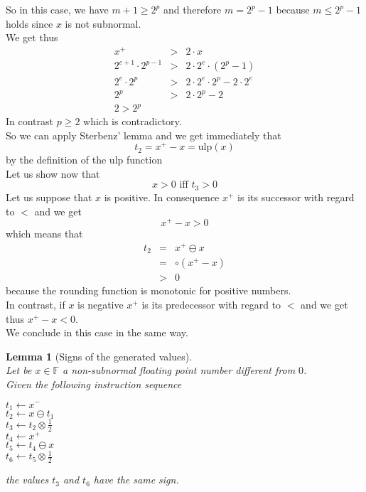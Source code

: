 \documentclass[a4paper,10pt,twoside]{article}
\newtheorem{lemma}[theorem]{Lemma}
\newenvironment{proof}[1][Proof]{\begin{trivlist}
\item[\hskip \labelsep {\bfseries #1}]}{\end{trivlist}}
\newcommand{\qed}{\nobreak \ifvmode \relax \else \ifdim \lastskip<1.5em \hskip-\lastskip
\hskip1.5em plus0em minus0.5em \fi \nobreak \vrule height0.75em width0.5em depth0.25em\fi}
\newcommand{\F}{\ensuremath{\mathbb {F}}}
\newcommand{\mUlp}{\ensuremath{\mathrm{ulp}}}
\begin{document}
\begin{proof}
So in this case, we have $m+1\geq 2^p$ and therefore $m=2^p - 1$ because $m \leq 2^p - 1$ holds 
since $x$ is not subnormal.\\
We get thus
\begin{eqnarray*}
x^+ & > & 2 \cdot x \\
2^{e+1} \cdot 2^{p-1} & > & 2 \cdot 2^e \cdot \left( 2^p - 1 \right) \\
2^e \cdot 2^p & > & 2 \cdot 2^e \cdot 2^p - 2 \cdot 2^e \\
2^p & > & 2 \cdot 2^p - 2 \\
2 > 2^p
\end{eqnarray*}
In contrast $p\geq2$ which is contradictory.\\
So we can apply Sterbenz' lemma \cite{Ste74} and we get immediately that
$$t_2 = x^+ - x = \mUlp \left( x \right)$$ by the definition of the $\mUlp$ function \\
Let us show now that
$$x > 0 \mbox{ iff } t_3 > 0$$
Let us suppose that $x$ is positive. In consequence $x^+$ is its successor with regard to $<$ and we get
$$x^+ - x > 0$$ which means that
\begin{eqnarray*}
t_2 & = & x^+ \ominus x \\
& = & \circ \left( x^+ - x \right) \\
& > & 0
\end{eqnarray*}
because the rounding function is monotonic for positive numbers.\\
In contrast, if $x$ is negative $x^+$ is its predecessor with regard to $<$ and we get thus $x^+ - x < 0$. \\
We conclude in this case in the same way.\qed
\end{proof}
\begin{lemma}[Signs of the generated values] \label{gensigne} ~\\
Let be $x \in \F$ a non-subnormal floating point number different from $0$.\\
Given the following instruction sequence
\begin{center}
$t_1 \gets x^-$ \\
$t_2 \gets x \ominus t_1$ \\
$t_3 \gets t_2 \otimes \frac{1}{2}$ \\
$t_4 \gets x^+$ \\
$t_5 \gets t_4 \ominus x$ \\
$t_6 \gets t_5 \otimes \frac{1}{2}$ 
\end{center}
the values $t_3$ and $t_6$ have the same sign.
\end{lemma}
\end{document}
